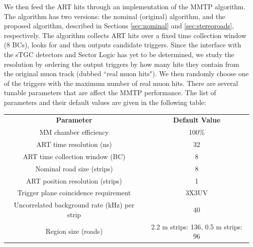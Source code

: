 \par 
We then feed the ART hits through an implementation of the MMTP algorithm. The algorithm has two versions: the nominal (original) algorithm, and the proposed algorithm, described in Sections \ref{sec:nominal} and \ref{sec:stereoroads}, respectively. The algorithm collects ART hits over a fixed time collection window (8 BCs), looks for and then outputs candidate triggers. Since the interface with the sTGC detectors and Sector Logic has yet to be determined, we study the resolution by ordering the output triggers by how many hits they contain from the original muon track (dubbed ``real muon hits"). We then randomly choose one of the triggers with the maximum number of real muon hits.
There are several tunable parameters that are affect the MMTP performance. The list of parameters and their default values are given in the following table:
\begin{center}
\begin{tabular}{ |c|c| } 
 \hline
 \textbf{Parameter} & \textbf{Default Value} \\ 
 MM chamber efficiency & 100\%  \\ 
 ART time resolution (ns) & 32 \\ 
 ART time collection window (BC) & 8 \\ 
 Nominal road size (strips) & 8 \\
 ART position resolution (strips) & 1\\
 Trigger plane coincidence requirement & 3X3UV \\
 Uncorrelated background rate (kHz) per strip & 40\\
 Region size (roads) & 2.2 m strips: 136, 0.5 m strips: 96\\
 \hline
\end{tabular}
\end{center}
